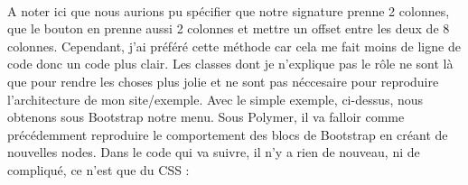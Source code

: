 \documentclass{article}
\begin{document}
\vspace{0.5cm}\\
A noter ici que nous aurions pu sp\'ecifier que notre signature prenne 2 colonnes, que le bouton en prenne aussi 2 colonnes et mettre un offset entre les deux de 8 colonnes. Cependant, j'ai pr\'ef\'er\'e cette m\'ethode car cela me fait moins de ligne de code donc un code plus clair. Les classes dont je n'explique pas le r\^ole ne sont l\`a que pour rendre les choses plus jolie et ne sont pas n\'eccesaire pour reproduire l'architecture de mon site/exemple. Avec le simple exemple, ci-dessus, nous obtenons sous Bootstrap notre menu. Sous Polymer, il va falloir comme pr\'ec\'edemment reproduire le comportement des blocs de Bootstrap en cr\'eant de nouvelles nodes. Dans le code qui va suivre, il n'y a rien de nouveau, ni de compliqu\'e, ce n'est que du CSS :
\vspace{0.5cm}\\
\vspace{0.5cm}
\end{document}
